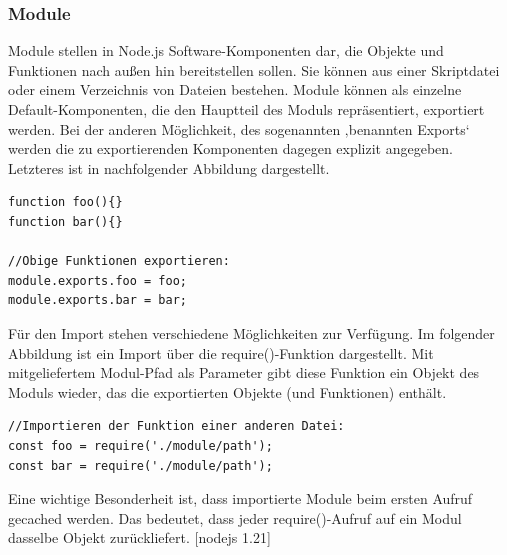 \newpage
\subsubsection{Module}

\noindent
Module stellen in Node.js Software-Komponenten dar, die Objekte und Funktionen nach außen hin bereitstellen sollen. 
Sie können aus einer Skriptdatei oder einem Verzeichnis von Dateien bestehen. Module können als einzelne Default-Komponenten, die den Hauptteil des Moduls repräsentiert, exportiert werden. 
Bei der anderen Möglichkeit, des sogenannten ‚benannten Exports‘ werden die zu exportierenden Komponenten dagegen explizit angegeben. Letzteres ist in nachfolgender Abbildung dargestellt. 
\newline
  
    
\begin{lstlisting}[caption=Benannter Export von Modulen,label=lst:ModuleExport]
function foo(){}
function bar(){}

//Obige Funktionen exportieren:
module.exports.foo = foo;
module.exports.bar = bar;
\end{lstlisting}

 
\noindent
Für den Import stehen verschiedene Möglichkeiten zur Verfügung. 
Im folgender Abbildung ist ein Import über die require()-Funktion dargestellt. 
Mit mitgeliefertem Modul-Pfad als Parameter gibt diese Funktion ein Objekt des Moduls wieder, das die exportierten Objekte (und Funktionen) enthält.
\newline
  
\begin{lstlisting}[caption=Import von Modulen,label=lst:ModuleImport]
//Importieren der Funktion einer anderen Datei:
const foo = require('./module/path');
const bar = require('./module/path');
\end{lstlisting}


\noindent
Eine wichtige Besonderheit ist, dass importierte Module  beim ersten Aufruf gecached werden. 
Das bedeutet, dass jeder require()-Aufruf auf ein Modul dasselbe Objekt zurückliefert. [nodejs 1.21]



